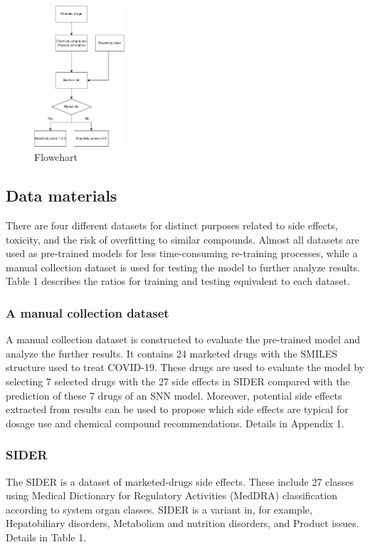 \documentclass[conference]{IEEEtran}
\begin{document}
\begin{figure}[htbp]
  \centering
  \includegraphics[width=0.3\textwidth]{flowchart.pdf}
  \caption{Flowchart}
\end{figure}

\subsection{Data materials}
There are four different datasets for distinct purposes related to side effects, toxicity, and the risk of overfitting to similar compounds. Almost all datasets are used as pre-trained models for less time-consuming re-training processes, while a manual collection dataset is used for testing the model to further analyze results. Table 1 describes the ratios for training and testing equivalent to each dataset.\\

\subsubsection{A manual collection dataset}
A manual collection dataset is constructed to evaluate the pre-trained model and analyze the further results. It contains 24 marketed drugs with the SMILES structure used to treat COVID-19. These drugs are used to evaluate the model by selecting 7 selected drugs with the 27 side effects in SIDER compared with the prediction of these 7 drugs of an SNN model. Moreover, potential side effects extracted from results can be used to propose which side effects are typical for dosage use and chemical compound recommendations. Details in Appendix 1.\\

\subsubsection{SIDER}
The SIDER is a dataset of marketed-drugs side effects. These include 27 classes using Medical Dictionary for Regulatory Activities (MedDRA) classification according to system organ classes. SIDER is a variant in, for example, Hepatobiliary disorders, Metabolism and nutrition disorders, and Product issues. Details in Table 1.\\
\end{document}

